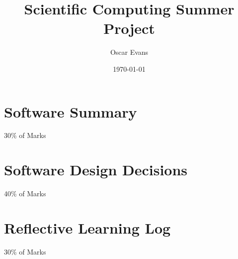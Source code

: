 \documentclass[10pt]{article}
\title{Scientific Computing Summer Project}
\author{Oscar Evans}
\date{\today}
\begin{document}
\maketitle

\begin{multicols}{2}

\section{Software Summary}
30\% of Marks



\section{Software Design Decisions}
40\% of Marks

\section{Reflective Learning Log}
30\% of Marks



\end{multicols}


\printbibliography 
\end{document}
